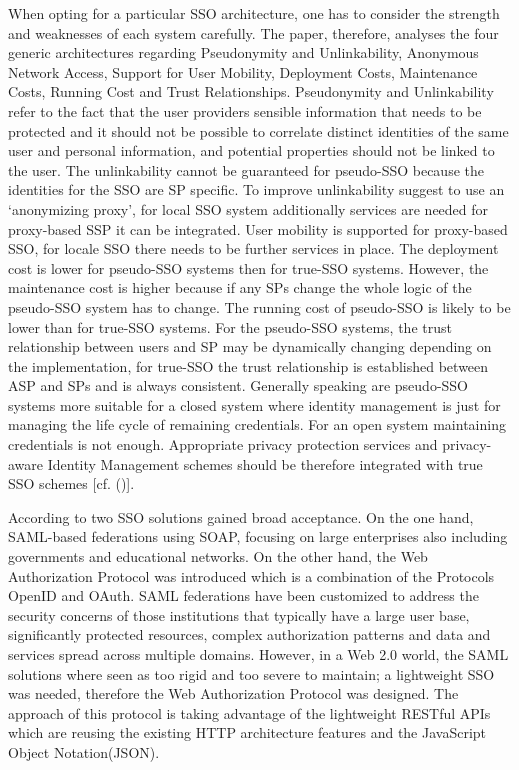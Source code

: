 {{{When opting for a particular SSO architecture, one has to consider the strength and weaknesses of each system carefully. The paper, therefore, analyses the four generic architectures regarding Pseudonymity and Unlinkability, Anonymous Network Access, Support for User Mobility, Deployment Costs, Maintenance Costs, Running Cost and Trust Relationships. Pseudonymity and Unlinkability refer to the fact that the user providers sensible information that needs to be protected and it should not be possible to correlate distinct identities of the same user and personal information, and potential properties should not be linked to the user. The unlinkability cannot be guaranteed for pseudo-SSO because the identities for the SSO are SP specific. To improve unlinkability   \cite{Pashalidis:2003:10.1007/3-540-45067-X_22} suggest to use an ‘anonymizing proxy’, for local SSO system additionally services are needed for proxy-based SSP it can be integrated. User mobility is supported for proxy-based SSO, for locale SSO there needs to be further services in place. The deployment cost is lower for pseudo-SSO systems then for true-SSO systems. However, the maintenance cost is higher because if any SPs change the whole logic of the pseudo-SSO system has to change. The running cost of pseudo-SSO is likely to be lower than for true-SSO systems. For the pseudo-SSO systems, the trust relationship between users and SP may be dynamically changing depending on the implementation, for true-SSO the trust relationship is established between ASP and SPs and is always consistent. Generally speaking are pseudo-SSO systems more suitable for a closed system where identity management is just for managing the life cycle of remaining credentials. For an open system maintaining credentials is not enough. Appropriate privacy protection services and privacy-aware Identity Management schemes should be therefore integrated with true SSO schemes [cf. (\cite{Pashalidis:2003:10.1007/3-540-45067-X_22})]. 


According to \cite{Lynch:2017:IIG} two SSO solutions gained broad acceptance. On the one hand, SAML-based federations using SOAP, focusing on large enterprises also including governments and educational networks. On the other hand, the Web Authorization Protocol was introduced which is a combination of the Protocols OpenID and OAuth. SAML federations have been customized to address the security concerns of those institutions that typically have a large user base, significantly protected resources, complex authorization patterns and data and services spread across multiple domains. However, in a Web 2.0 world, the SAML solutions where seen as too rigid and too severe to maintain; a lightweight SSO was needed, therefore the Web Authorization Protocol was designed. The approach of this protocol is taking advantage of the lightweight RESTful APIs which are reusing the existing HTTP architecture features and the JavaScript Object Notation(JSON).

}}}
